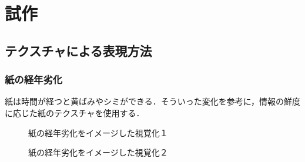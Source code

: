 \section{試作}

\subsection{テクスチャによる表現方法}
\label{sec:ver-texture}

\subsubsection{紙の経年劣化}
\label{subsec:ver-tex-sheet}

紙は時間が経つと黄ばみやシミができる．そういった変化を参考に，情報の鮮度に応じた紙のテクスチャを使用する．

\begin{figure}[htbp]
  \begin{minipage}{0.5\hsize}
    \begin{center}
    \end{center}
    \caption{紙の経年劣化をイメージした視覚化１}
    \label{fig:ver-sheet1}
  \end{minipage}
  \begin{minipage}{0.5\hsize}
    \begin{center}
    \end{center}
    \caption{紙の経年劣化をイメージした視覚化２}
    \label{fig:ver-sheet2}
  \end{minipage}
\end{figure}


